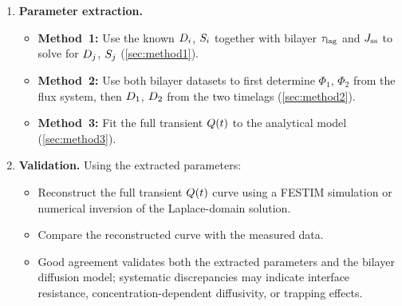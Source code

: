 \begin{enumerate}
  \item \textbf{Parameter extraction.}
        \begin{itemize}
          \item \textbf{Method~1:} Use the known $D_{i}$, $S_{i}$ together
                with bilayer $\tau_{\mathrm{lag}}$ and $J_{\mathrm{ss}}$ to solve for $D_{j}$, $S_{j}$
                (\cref{sec:method1}).
          \item \textbf{Method~2:} Use both bilayer datasets to first determine
                $\Phi_1$, $\Phi_2$ from the flux system, then $D_{1}$, $D_{2}$
                from the two timelags (\cref{sec:method2}).
          \item \textbf{Method~3:} Fit the full transient $Q(t)$ to the
                analytical model (\cref{sec:method3}).
        \end{itemize}

  \item \textbf{Validation.}  Using the extracted parameters:
        \begin{itemize}
          \item Reconstruct the full transient $Q(t)$ curve using a FESTIM
                simulation or numerical inversion of the Laplace-domain
                solution.
          \item Compare the reconstructed curve with the measured data.
          \item Good agreement validates both the extracted parameters and the
                bilayer diffusion model; systematic discrepancies may indicate
                interface resistance, concentration-dependent diffusivity, or
                trapping effects.
        \end{itemize}
\end{enumerate}

